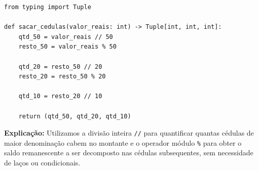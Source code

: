 \ifmostrarGabarito
\begin{verbatim}
from typing import Tuple

def sacar_cedulas(valor_reais: int) -> Tuple[int, int, int]:
    qtd_50 = valor_reais // 50
    resto_50 = valor_reais % 50
    
    qtd_20 = resto_50 // 20
    resto_20 = resto_50 % 20
    
    qtd_10 = resto_20 // 10
    
    return (qtd_50, qtd_20, qtd_10)
\end{verbatim}

\textbf{Explicação:}
Utilizamos a divisão inteira \texttt{//} para quantificar quantas cédulas de maior denominação cabem no montante e o operador módulo \texttt{\%} para obter o saldo remanescente a ser decomposto nas cédulas subsequentes, sem necessidade de laços ou condicionais.
\else
{}
\clearpage
{}
\clearpage
\fi
